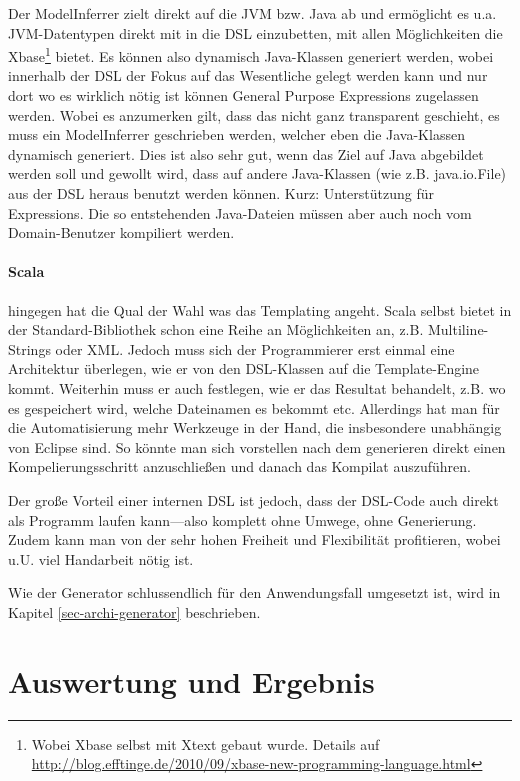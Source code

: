 Der ModelInferrer zielt direkt auf die JVM bzw. Java ab und ermöglicht es
u.a. JVM-Datentypen direkt mit in die DSL einzubetten, mit allen Möglichkeiten
die Xbase\footnote{Wobei Xbase selbst mit Xtext gebaut wurde. Details auf
\url{http://blog.efftinge.de/2010/09/xbase-new-programming-language.html}}
bietet. Es können also dynamisch Java-Klassen generiert werden, wobei innerhalb
der DSL der Fokus auf das Wesentliche gelegt werden kann und nur dort wo es
wirklich nötig ist können General Purpose Expressions zugelassen werden.
Wobei es anzumerken gilt, dass das nicht ganz transparent geschieht,
es muss ein ModelInferrer geschrieben werden, welcher eben die Java-Klassen
dynamisch generiert.
Dies ist also sehr gut, wenn das Ziel auf Java abgebildet werden soll
und gewollt wird, dass auf andere Java-Klassen (wie z.B. java.io.File)
aus der DSL heraus benutzt werden können. Kurz: Unterstützung für Expressions.
Die so entstehenden Java-Dateien müssen aber auch noch vom Domain-Benutzer
kompiliert werden.\cite{xtext}

\paragraph{Scala} hingegen hat die Qual der Wahl was das Templating angeht.
Scala selbst bietet in der Standard-Bibliothek schon
eine Reihe an Möglichkeiten an,
z.B. Multiline-Strings oder XML. Jedoch muss sich der Programmierer erst einmal
eine Architektur überlegen, wie er von den DSL-Klassen auf die Template-Engine
kommt. Weiterhin muss er auch festlegen, wie er das Resultat behandelt,
z.B. wo es gespeichert wird, welche Dateinamen es bekommt etc.
Allerdings hat man für die Automatisierung mehr Werkzeuge in der Hand,
die insbesondere unabhängig von Eclipse sind. So könnte man sich vorstellen
nach dem generieren direkt einen Kompelierungsschritt anzuschließen und
danach das Kompilat auszuführen.

Der große Vorteil einer internen DSL ist jedoch, dass der DSL-Code auch
direkt als Programm laufen kann---also komplett ohne Umwege, ohne Generierung.
Zudem kann man von der sehr hohen Freiheit und Flexibilität profitieren,
wobei u.U. viel Handarbeit nötig ist.

Wie der Generator schlussendlich für den Anwendungsfall umgesetzt ist,
wird in Kapitel \ref{sec-archi-generator} beschrieben.

\section{Auswertung und Ergebnis}\label{sec-auswertung}


